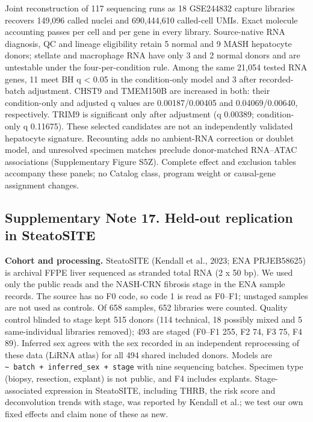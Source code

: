 Joint reconstruction of 117 sequencing runs as 18 GSE244832 capture libraries
recovers 149,096 called nuclei and 690,444,610 called-cell UMIs. Exact molecule
accounting passes per cell and per gene in every library. Source-native RNA
diagnosis, QC and lineage eligibility retain 5 normal and 9 MASH hepatocyte
donors; stellate and macrophage RNA have only 3 and 2 normal donors and are
untestable under the four-per-condition rule. Among the same 21,054 tested RNA
genes, 11 meet BH q \textless{} 0.05 in the condition-only model and 3 after recorded-batch
adjustment. CHST9 and TMEM150B are increased in both: their condition-only and
adjusted q values are 0.00187/0.00405 and 0.04069/0.00640, respectively. TRIM9
is significant only after adjustment (q 0.00389; condition-only q 0.11675).
These selected candidates are not an independently validated hepatocyte
signature. Recounting adds no ambient-RNA correction or doublet model, and
unresolved specimen matches preclude donor-matched RNA--ATAC associations
(Supplementary Figure S5Z). Complete effect and exclusion tables accompany
these panels; no Catalog class, program weight or causal-gene assignment changes.

\subsection{Supplementary Note 17. Held-out replication in SteatoSITE}\label{supplementary-note-17.-held-out-replication-in-steatosite}

\textbf{Cohort and processing.} SteatoSITE (Kendall et al., 2023; ENA PRJEB58625) is archival FFPE liver sequenced as stranded total RNA (2 x 50 bp). We used only the public reads and the NASH-CRN fibrosis stage in the ENA sample records. The source has no F0 code, so code 1 is read as F0--F1; unstaged samples are not used as controls. Of 658 samples, 652 libraries were counted. Quality control blinded to stage kept 515 donors (114 technical, 18 possibly mixed and 5 same-individual libraries removed); 493 are staged (F0--F1 255, F2 74, F3 75, F4 89). Inferred sex agrees with the sex recorded in an independent reprocessing of these data (LiRNA atlas) for all 494 shared included donors. Models are \texttt{\textasciitilde{}\ batch\ +\ inferred\_\allowbreak{}sex\ +\ stage} with nine sequencing batches. Specimen type (biopsy, resection, explant) is not public, and F4 includes explants. Stage-associated expression in SteatoSITE, including THRB, the risk score and deconvolution trends with stage, was reported by Kendall et al.; we test our own fixed effects and claim none of these as new.

